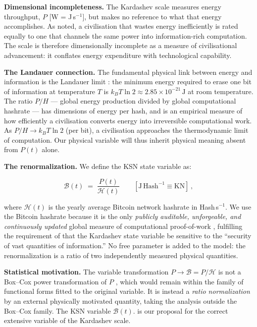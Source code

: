 \documentclass[final,5p,times,twocolumn,authoryear]{elsarticle}
\begin{document}
\textbf{Dimensional incompleteness.} The Kardashev scale measures energy
throughput, $P$ [W = J\,s$^{-1}$], but makes no reference to what that energy
accomplishes. As \citet{sagan73} noted, a civilisation that wastes energy
inefficiently is rated equally to one that channels the same power into
information-rich computation. The scale is therefore dimensionally incomplete
as a measure of civilisational advancement: it conflates energy expenditure
with technological capability.
 
\textbf{The Landauer connection.} The fundamental physical link between energy
and information is the Landauer limit \citep{Landauer1961,Bennett1982}: the 
minimum energy required to erase one bit of information at temperature $T$ 
is $k_B T \ln 2 \approx 2.85 \times 10^{-21}\,\mathrm{J}$ at room temperature. The ratio
$P / H$ --- global energy production divided by global computational hashrate
--- has dimensions of energy per hash, and is an empirical measure of how
efficiently a civilisation converts energy into irreversible computational
work. As $P/H \to k_B T \ln 2$ (per bit), a civilisation approaches the
thermodynamic limit of computation. Our physical variable will thus inherit physical meaning absent from $P(t)$ alone.
 
\textbf{The renormalization.} We define the KSN state variable as:

\begin{equation}
    \mathscr{B}(t) \;=\; \frac{P(t)}{\mathcal{H}(t)}
    \qquad \left[\mathrm{J\,Hash^{-1}} \equiv \mathrm{KN}\right]\,,
    \label{eq:ksn}
\end{equation}

where $\mathcal{H}(t)$ is the yearly average Bitcoin network hashrate in
Hash\,s$^{-1}$. We use the Bitcoin hashrate because it is the only
\emph{publicly auditable, unforgeable, and continuously updated}
global measure of computational proof-of-work \citep{nak2009},
fulfilling the requirement of \citet{sagan73} that the Kardashev state
variable be sensitive to the ``security of vast quantities of information.''
No free parameter is added to the model: the renormalization is a ratio
of two independently measured physical quantities.
 
\textbf{Statistical motivation.} The variable transformation
$P \to \mathscr{B} = P/\mathcal{H}$ is not a Box--Cox power transformation of $P$
\citep{BoxCox1964}, which would remain within the family of
functional forms fitted to the original variable. It is instead a
\emph{ratio normalization} by an external physically motivated quantity,
taking the analysis outside the Box--Cox family. The KSN variable
$\mathscr{B}(t)$.  is our proposal for the correct extensive variable of the
Kardashev scale.
\end{document}
